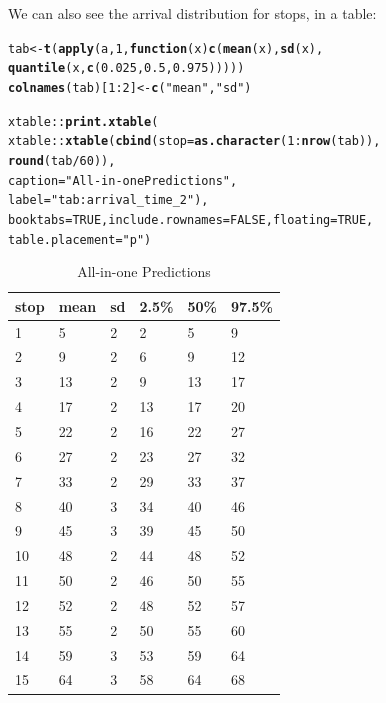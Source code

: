 \documentclass[11pt]{article}\usepackage[]{graphicx}\usepackage[]{color}
\makeatletter
\newcommand{\hlnum}[1]{\textcolor[rgb]{0.686,0.059,0.569}{#1}}%
\newcommand{\hlstr}[1]{\textcolor[rgb]{0.192,0.494,0.8}{#1}}%
\newcommand{\hlopt}[1]{\textcolor[rgb]{0,0,0}{#1}}%
\newcommand{\hlstd}[1]{\textcolor[rgb]{0.345,0.345,0.345}{#1}}%
\newcommand{\hlkwa}[1]{\textcolor[rgb]{0.161,0.373,0.58}{\textbf{#1}}}%
\newcommand{\hlkwb}[1]{\textcolor[rgb]{0.69,0.353,0.396}{#1}}%
\newcommand{\hlkwc}[1]{\textcolor[rgb]{0.333,0.667,0.333}{#1}}%
\newcommand{\hlkwd}[1]{\textcolor[rgb]{0.737,0.353,0.396}{\textbf{#1}}}%
\newenvironment{kframe}{%
 \def\at@end@of@kframe{}%
 \ifinner\ifhmode%
  \def\at@end@of@kframe{\end{minipage}}%
  \begin{minipage}{\columnwidth}%
 \fi\fi%
 \def\FrameCommand##1{\hskip\@totalleftmargin \hskip-\fboxsep
 \colorbox{shadecolor}{##1}\hskip-\fboxsep
     \hskip-\linewidth \hskip-\@totalleftmargin \hskip\columnwidth}%
 \MakeFramed {\advance\hsize-\width
   \@totalleftmargin\z@ \linewidth\hsize
   \@setminipage}}%
 {\par\unskip\endMakeFramed%
 \at@end@of@kframe}
\makeatother
\begin{document}
We can also see the arrival distribution for stops, in a table:
\begin{kframe}
\begin{alltt}
\hlstd{tab} \hlkwb{<-} \hlkwd{t}\hlstd{(}\hlkwd{apply}\hlstd{(a,} \hlnum{1}\hlstd{,} \hlkwa{function}\hlstd{(}\hlkwc{x}\hlstd{)} \hlkwd{c}\hlstd{(}\hlkwd{mean}\hlstd{(x),} \hlkwd{sd}\hlstd{(x),}
                                   \hlkwd{quantile}\hlstd{(x,} \hlkwd{c}\hlstd{(}\hlnum{0.025}\hlstd{,} \hlnum{0.5}\hlstd{,} \hlnum{0.975}\hlstd{)))))}
\hlkwd{colnames}\hlstd{(tab)[}\hlnum{1}\hlopt{:}\hlnum{2}\hlstd{]} \hlkwb{<-} \hlkwd{c}\hlstd{(}\hlstr{"mean"}\hlstd{,} \hlstr{"sd"}\hlstd{)}

\hlstd{xtable}\hlopt{::}\hlkwd{print.xtable}\hlstd{(}
    \hlstd{xtable}\hlopt{::}\hlkwd{xtable}\hlstd{(}\hlkwd{cbind}\hlstd{(}\hlkwc{stop} \hlstd{=} \hlkwd{as.character}\hlstd{(}\hlnum{1}\hlopt{:}\hlkwd{nrow}\hlstd{(tab)),}
                         \hlkwd{round}\hlstd{(tab} \hlopt{/} \hlnum{60}\hlstd{)),}
                   \hlkwc{caption} \hlstd{=} \hlstr{"All-in-one Predictions"}\hlstd{,}
                   \hlkwc{label} \hlstd{=} \hlstr{"tab:arrival_time_2"}\hlstd{),}
    \hlkwc{booktabs} \hlstd{=} \hlnum{TRUE}\hlstd{,} \hlkwc{include.rownames} \hlstd{=} \hlnum{FALSE}\hlstd{,} \hlkwc{floating} \hlstd{=} \hlnum{TRUE}\hlstd{,}
    \hlkwc{table.placement} \hlstd{=} \hlstr{"p"}\hlstd{)}
\end{alltt}
\end{kframe}%
\begin{table}[p]
\centering
\begin{tabular}{llllll}
  \toprule
stop & mean & sd & 2.5\% & 50\% & 97.5\% \\ 
  \midrule
1 & 5 & 2 & 2 & 5 & 9 \\ 
  2 & 9 & 2 & 6 & 9 & 12 \\ 
  3 & 13 & 2 & 9 & 13 & 17 \\ 
  4 & 17 & 2 & 13 & 17 & 20 \\ 
  5 & 22 & 2 & 16 & 22 & 27 \\ 
  6 & 27 & 2 & 23 & 27 & 32 \\ 
  7 & 33 & 2 & 29 & 33 & 37 \\ 
  8 & 40 & 3 & 34 & 40 & 46 \\ 
  9 & 45 & 3 & 39 & 45 & 50 \\ 
  10 & 48 & 2 & 44 & 48 & 52 \\ 
  11 & 50 & 2 & 46 & 50 & 55 \\ 
  12 & 52 & 2 & 48 & 52 & 57 \\ 
  13 & 55 & 2 & 50 & 55 & 60 \\ 
  14 & 59 & 3 & 53 & 59 & 64 \\ 
  15 & 64 & 3 & 58 & 64 & 68 \\ 
   \bottomrule
\end{tabular}
\caption{All-in-one Predictions} 
\label{tab:arrival_time_2}
\end{table}
\end{document}
